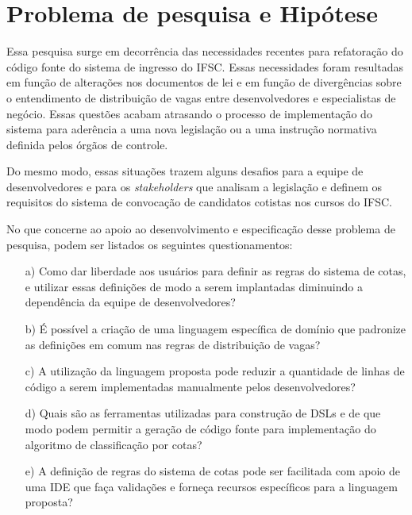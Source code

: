 \section{Problema de pesquisa e Hipótese}
\label{problema}

Essa pesquisa surge em decorrência das necessidades recentes para refatoração do código fonte do sistema de ingresso do \gls{IFSC}. Essas necessidades foram resultadas em função de alterações nos documentos de lei e em função de  divergências sobre o entendimento de distribuição de vagas entre desenvolvedores e especialistas de negócio. Essas questões acabam atrasando o processo de implementação do sistema para aderência a uma nova legislação ou a uma instrução normativa definida pelos órgãos de controle.

Do mesmo modo, essas situações trazem alguns desafios para a equipe de desenvolvedores e para os \textit{stakeholders} que analisam a legislação e definem os requisitos do sistema de convocação de candidatos cotistas nos cursos do \gls{IFSC}. 

No que concerne ao apoio ao desenvolvimento e especificação desse problema de pesquisa, podem ser listados os seguintes questionamentos:

\begin{enumerate}
    \item[a)] Como dar liberdade aos usuários para definir as regras do sistema de cotas, e utilizar essas definições de modo a serem implantadas diminuindo a dependência da equipe de  desenvolvedores?
    
    \item[b)] É possível a criação de uma linguagem específica de domínio que padronize as definições em comum nas regras de distribuição de vagas?
    
    \item[c)] A utilização da linguagem proposta pode reduzir a quantidade de linhas de código a serem implementadas manualmente pelos desenvolvedores?
    
    \item[d)] Quais são as ferramentas utilizadas para construção de \gls{DSL}s e de que modo podem permitir a geração de código fonte para implementação do algoritmo de classificação por cotas?
    
    \item[e)] A definição de regras do sistema de cotas pode ser facilitada com apoio de uma \gls{IDE} que faça validações e forneça recursos específicos para a linguagem proposta?
    

    
\end{enumerate}